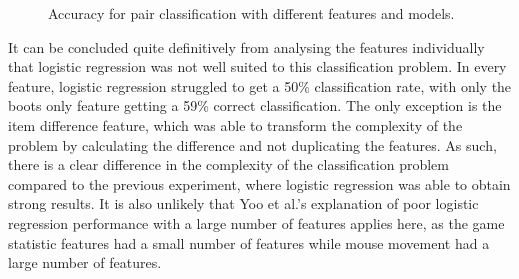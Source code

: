 \documentclass[Report.tex]{subfiles}
\newcommand{\plotbar}[5]{
\addplot+[
	discard if not={numSplits}{#1},
	discard if not={split}{#2},
	discard if not={features}{#3},
] table [x=model, y=#4,col sep=comma] {data/19-pair-cv.csv};
\addlegendentry{#5}
}
\begin{document}
\begin{figure}[H]
\newcommand{\comparisonaxis}[2]{
\begin{axis}[
	title={\textbf{#1}},
	ylabel={#2},
	ybar,
	bar width=1.5em,
	width=15cm,
	height=4cm,
	legend style={at={(0.5,-0.35)},anchor=north,/tikz/every even column/.append style={column sep=0.5cm}},
	xtick=data,
	enlarge x limits=0.25,
	ymin=0.4, ymax=1,
	symbolic x coords={Logistic Regression, Random Forest, Multi-layer Perceptron},
    x tick label style={align=center,text width=2.5cm},
]
}
\centering
{}


\caption{Accuracy for pair classification with different features and models.}
\end{figure}


It can be concluded quite definitively from analysing the features individually that logistic regression was not well suited to this classification problem. In every feature, logistic regression struggled to get a 50\% classification rate, with only the boots only feature getting a 59\% correct classification. The only exception is the item difference feature, which was able to transform the complexity of the problem by calculating the difference and not duplicating the features. As such, there is a clear difference in the complexity of the classification problem compared to the previous experiment, where logistic regression was able to obtain strong results. It is also unlikely that Yoo et al.'s explanation of poor logistic regression performance with a large number of features \cite{lr-vs-rf} applies here, as the game statistic features had a small number of features while mouse movement had a large number of features. 
\end{document}

